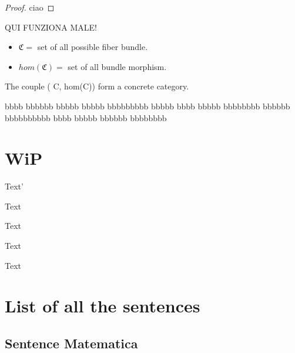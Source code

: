 \documentclass[a4paper,12pt]{article}
\begin{document}
\begin{proof}
ciao
\end{proof}

QUI FUNZIONA MALE!
\begin{proposition}
	\begin{hypothesis}
			\begin{itemize}
				\item $\mathfrak{C} = $ set of all possible fiber bundle.
				\item $hom(\mathfrak{C}) = $ set of all bundle morphism.
			\end{itemize}
	\end{hypothesis}
	\begin{thesis}
				The couple ( C, hom(C)) form a concrete category.
	\end{thesis}
\end{proposition}


\begin{definition}[Bu]
bbbb bbbbbb bbbbb bbbbb bbbbbbbbb bbbbb bbbb bbbbb bbbbbbbb bbbbbb bbbbbbbbbb bbbb bbbbb bbbbbb 
bbbbbbbb
\end{definition}


\section{WiP}

\begin{notationfix}
Text'
\end{notationfix}

\begin{TAM}
Text
\end{TAM}

\begin{example}
Text
\end{example}

\begin{observation}
Text
\end{observation}

\begin{remark}
Text
\end{remark}


\section{List of all the sentences}

\subsection{Sentence Matematica}
\end{document}
